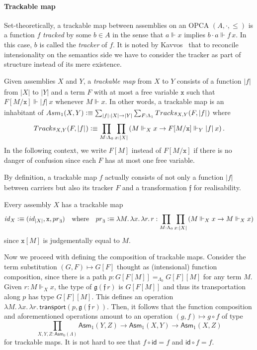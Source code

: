 \documentclass[a4paper,UKenglish,numberwithinsect,cleveref,thm-restate]{lipics-v2021}
\newcommand{\tproj}[3][]{\mathopen{}\left|#3\right|_{#2}^{#1}\mathclose{}}
\newcommand{\bproj}[1]{\tproj{}{#1}}
\newcommand{\Asm}{\mathsf{Asm}}
\newcommand{\defeq}{\vcentcolon\equiv}
\newcommand{\id}{\mathsf{id}}
\newcommand{\iid}{\mathit{id}}
\newcommand{\pr}{\mathsf{pr}}
\theoremstyle{plain}
\begin{document}
\paragraph*{Trackable map}%

Set-theoretically, a trackable map between assemblies on an OPCA $(A, \cdot, \leq)$ is a function $f$ \emph{tracked} by some $b \in A$ in the sense that $a \Vdash x$ implies $b \cdot a \Vdash f\,x$.
In this case, $b$ is called the \emph{tracker} of $f$.
It is noted by Kavvos~\cite{Kavvos2017b} that to reconcile intensionality on the semantics side we have to consider the tracker as part of structure instead of its mere existence.
\begin{definition}\label{def:trackable}
  Given assemblies $X$ and $Y$, a \emph{trackable map} from $X$ to $Y$ consists of a function $\bproj{f}$ from $|X|$ to $|Y|$ and a term $F$ with at most a free variable $\mathtt{x}$ such that $F[M/\mathtt{x}] \Vdash \bproj{f}\,x$ whenever $M \Vdash x$.
  In other words, a trackable map is an inhabitant of $\Asm_1(X, Y) \defeq \sum_{\bproj{f} : |X| \to |Y|} \sum_{F : \Lambda_1} \mathsf{Tracks}_{X, Y}(F, \bproj{f})$ where
  \[
    \mathsf{Tracks}_{X, Y}(F, \bproj{f}) \defeq \prod_{M : \Lambda_0} \prod_{x : |X|}
    \left( M \Vdash_X x \to F[M/\mathtt{x}] \Vdash_Y \bproj{f}\, x \right).
  \]
  In the following context, we write $F[M]$ instead of $F[M/\mathtt{x}]$ if there is no danger of confusion since each $F$ has at most one free variable.
\end{definition}
By definition, a trackable map $f$ actually consists of not only a function $\bproj{f}$ between carriers but also its tracker $F$ and a transformation $\mathfrak{f}$ for realisability.

\begin{example}[Identity]
  Every assembly $X$ has a trackable map
  \[
    \iid_X \defeq (\id_{|X|}, \mathtt{x}, \pr_3)
    \quad\text{where}\quad
  \pr_3 \defeq \lambda M.\,\lambda x.\,\lambda r.\, r : \prod_{M : \Lambda_0} \prod_{x : |X|} \left( M \Vdash_X x \to M  \Vdash_X x  \right)
  \]
  since $\mathtt{x}[M]$ is judgementally equal to $M$.
\end{example}

Now we proceed with defining the composition of trackable maps. Consider the term substitution $(G, F)
\mapsto G [ F ]$ thought as (intensional) function composition, since there is a path $p : G[F[M]] =_{\Lambda_0} G[F] [M]$ for any term $M$.
Given $r : M \Vdash_X x$, the type of $\mathfrak{g}(\mathfrak{f}\,r)$ is $G[F[M]]$ and thus its transportation along $p$ has type $G[F][M]$.
This defines an operation $\lambda M.\,\lambda x.\,\lambda r.\, \mathsf{transport}(p, \mathfrak{g}(\mathfrak{f}\,r))$.
Then, it follows that the function composition and aforementioned operations amount to an operation $(g, f) \mapsto g \circ f$ of type
\[
  \prod_{X, Y, Z : \Asm_0(\Lambda)} \Asm_1(Y, Z) \to \Asm_1(X, Y) \to \Asm_1(X, Z)
\]
for trackable maps. It is not hard to see that $f \circ \id = f$ and $\id \circ f = f$.
\end{document}
